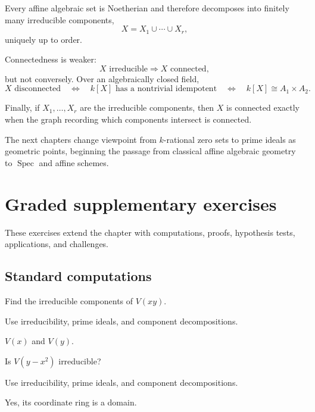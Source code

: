 Every affine algebraic set is Noetherian and therefore decomposes into finitely many
irreducible components,
\[
X=X_1\cup\cdots\cup X_r,
\]
uniquely up to order.

Connectedness is weaker:
\[
X\text{ irreducible}
\Longrightarrow
X\text{ connected},
\]
but not conversely.  Over an algebraically closed field,
\[
X\text{ disconnected}
\quad\Longleftrightarrow\quad
k[X]\text{ has a nontrivial idempotent}
\quad\Longleftrightarrow\quad
k[X]\cong A_1\times A_2.
\]

Finally, if \(X_1,\dots,X_r\) are the irreducible components, then \(X\) is connected
exactly when the graph recording which components intersect is connected.

The next chapters change viewpoint from \(k\)-rational zero sets to prime ideals as
geometric points, beginning the passage from classical affine algebraic geometry to
\(\operatorname{Spec}\) and affine schemes.
\section{Graded supplementary exercises}
These exercises extend the chapter with computations, proofs, hypothesis tests, applications, and challenges.

\subsection*{Standard computations}

\begin{exercise}[Axes]\label{exr:vi05-expand-01}
Find the irreducible components of $V(xy)$.
\end{exercise}
\begin{hint}
Use irreducibility, prime ideals, and component decompositions.
\end{hint}
\begin{solution}
$V(x)$ and $V(y)$.
\end{solution}

\begin{exercise}\label{exr:vi05-expand-02}
Is $V(y-x^2)$ irreducible?
\end{exercise}
\begin{hint}
Use irreducibility, prime ideals, and component decompositions.
\end{hint}
\begin{solution}
Yes, its coordinate ring is a domain.
\end{solution}


